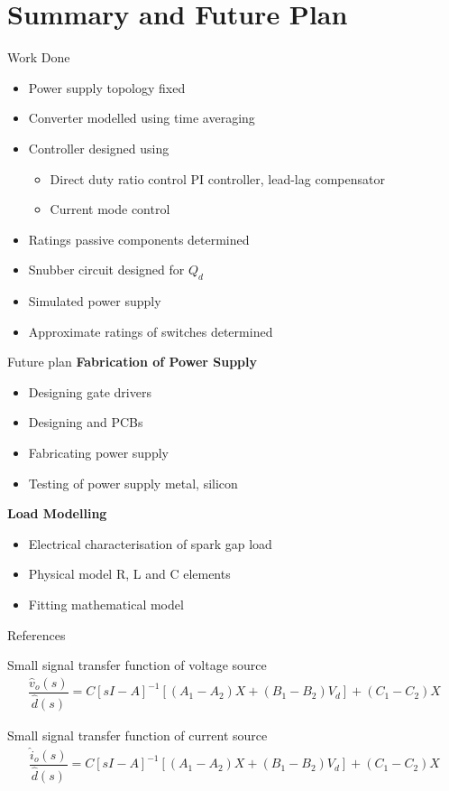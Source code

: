 \documentclass[10pt]{beamer}
\begin{document}
\section{Summary and Future Plan}
\begin{frame}{Work Done}
\begin{itemize}
\item Power supply topology fixed
\item Converter modelled using time averaging
\item Controller designed using
\begin{itemize}
\item Direct duty ratio control \textendash{} PI controller, lead-lag compensator
\item Current mode control
\end{itemize}
\item Ratings passive components determined
\item Snubber circuit designed for $Q_d$
\item Simulated power supply
\item Approximate ratings of switches determined
\end{itemize}
\end{frame}
\begin{frame}{Future plan}
\textbf{Fabrication of Power Supply}
\begin{itemize}
\item Designing gate drivers
\item Designing and PCBs
\item Fabricating power supply
\item Testing of power supply \textendash{} metal, silicon
\end{itemize}
\textbf{Load Modelling}
\begin{itemize}
\item Electrical characterisation of spark gap load
\item Physical model R, L and C elements
\item Fitting mathematical model
\end{itemize}
\end{frame}


\begin{frame}[allowframebreaks]{References}
  
  
\end{frame}

\appendix
\begin{frame}[allowframebreaks]{}
Small signal transfer function of voltage source
    \begin{multline}
    \dfrac{\hat{v}_o(s)}{\hat{d}(s)} = C[sI-A]^{-1}[(A_1-A_2)X+(B_1-B_2)V_d]+(C_1-C_2)X
    \label{eq:mod27a}
  \end{multline}

Small signal transfer function of current source
  \begin{multline}
    \dfrac{\hat{i}_o(s)}{\hat{d}(s)} = C[sI-A]^{-1}[(A_1-A_2)X+(B_1-B_2)V_d]+(C_1-C_2)X
    \label{eq:mod35}
  \end{multline}
\end{frame}
\end{document}
